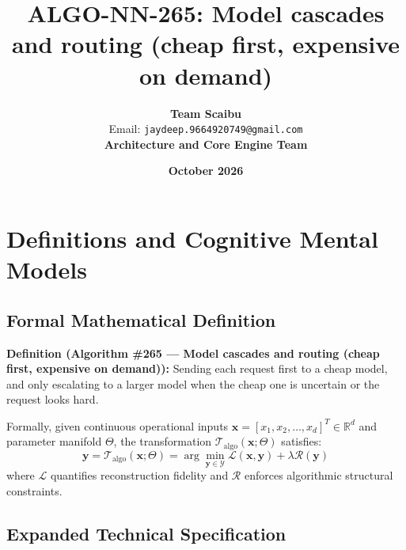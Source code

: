 \documentclass[11pt,a4paper]{article}
\title{\textbf{ALGO-NN-265: Model cascades and routing (cheap first, expensive on demand)}}
\author{\textbf{Team Scaibu} \\ \small Email: \texttt{jaydeep.9664920749@gmail.com} \\ \small \textbf{Architecture and Core Engine Team}}
\date{\textbf{October 2026}}
\theoremstyle{definition}
\begin{document}
\maketitle

\section{Definitions and Cognitive Mental Models}

\subsection{Formal Mathematical Definition}
\textbf{Definition (Algorithm \#265 --- Model cascades and routing (cheap first, expensive on demand)):}
Sending each request first to a cheap model, and only escalating to a larger model when the cheap one is uncertain or the request looks hard.

Formally, given continuous operational inputs $\mathbf{x} = [x_1, x_2, \dots, x_d]^T \in \mathbb{R}^d$ and parameter manifold $\Theta$, the transformation $\mathcal{T}_{\text{algo}}(\mathbf{x}; \Theta)$ satisfies:
{\boldmath
\begin{equation}
\mathbf{y} = \mathcal{T}_{\text{algo}}(\mathbf{x}; \Theta) = \arg\min_{\mathbf{y} \in \mathcal{Y}} \mathcal{L}(\mathbf{x}, \mathbf{y}) + \lambda \mathcal{R}(\mathbf{y})
\end{equation}
}
where $\mathcal{L}$ quantifies reconstruction fidelity and $\mathcal{R}$ enforces algorithmic structural constraints.

\subsection{Expanded Technical Specification}
\end{document}
